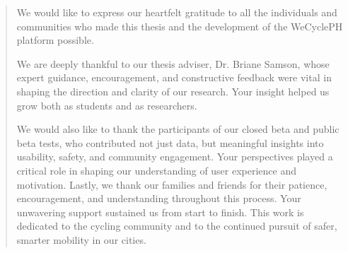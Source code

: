 %
%
%                 

\renewcommand{\abstractname}{Acknowledgments}
\begin{abstract}

We would like to express our heartfelt gratitude to all the individuals and communities who made this thesis and the development of the WeCyclePH platform possible.

We are deeply thankful to our thesis adviser, Dr. Briane Samson, whose expert guidance, encouragement, and constructive feedback were vital in shaping the direction and clarity of our research. Your insight helped us grow both as students and as researchers.

We would also like to thank the participants of our closed beta and public beta tests, who contributed not just data, but meaningful insights into usability, safety, and community engagement. Your perspectives played a critical role in shaping our understanding of user experience and motivation.
Lastly, we thank our families and friends for their patience, encouragement, and understanding throughout this process. Your unwavering support sustained us from start to finish.
This work is dedicated to the cycling community and to the continued pursuit of safer, smarter mobility in our cities.

\end{abstract}
